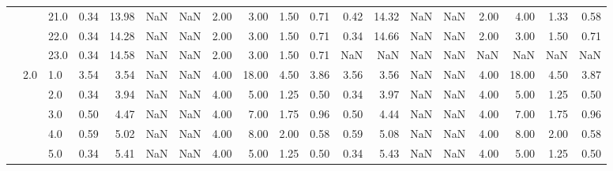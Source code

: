 \begin{tabular}{lllrrrrrrrrrrrrrrrr}
       &     & 21.0 &      0.34 &      13.98 &               NaN &                NaN & 2.00 &   3.00 &             1.50 &                         0.71 &      0.42 &      14.32 &               NaN &                NaN & 2.00 &   4.00 &             1.33 &                         0.58 \\
       &     & 22.0 &      0.34 &      14.28 &               NaN &                NaN & 2.00 &   3.00 &             1.50 &                         0.71 &      0.34 &      14.66 &               NaN &                NaN & 2.00 &   3.00 &             1.50 &                         0.71 \\
       &     & 23.0 &      0.34 &      14.58 &               NaN &                NaN & 2.00 &   3.00 &             1.50 &                         0.71 &       NaN &        NaN &               NaN &                NaN &  NaN &    NaN &              NaN &                          NaN \\
       & 2.0 & 1.0  &      3.54 &       3.54 &               NaN &                NaN & 4.00 &  18.00 &             4.50 &                         3.86 &      3.56 &       3.56 &               NaN &                NaN & 4.00 &  18.00 &             4.50 &                         3.87 \\
       &     & 2.0  &      0.34 &       3.94 &               NaN &                NaN & 4.00 &   5.00 &             1.25 &                         0.50 &      0.34 &       3.97 &               NaN &                NaN & 4.00 &   5.00 &             1.25 &                         0.50 \\
       &     & 3.0  &      0.50 &       4.47 &               NaN &                NaN & 4.00 &   7.00 &             1.75 &                         0.96 &      0.50 &       4.44 &               NaN &                NaN & 4.00 &   7.00 &             1.75 &                         0.96 \\
       &     & 4.0  &      0.59 &       5.02 &               NaN &                NaN & 4.00 &   8.00 &             2.00 &                         0.58 &      0.59 &       5.08 &               NaN &                NaN & 4.00 &   8.00 &             2.00 &                         0.58 \\
       &     & 5.0  &      0.34 &       5.41 &               NaN &                NaN & 4.00 &   5.00 &             1.25 &                         0.50 &      0.34 &       5.43 &               NaN &                NaN & 4.00 &   5.00 &             1.25 &                         0.50 \\

\end{tabular}

